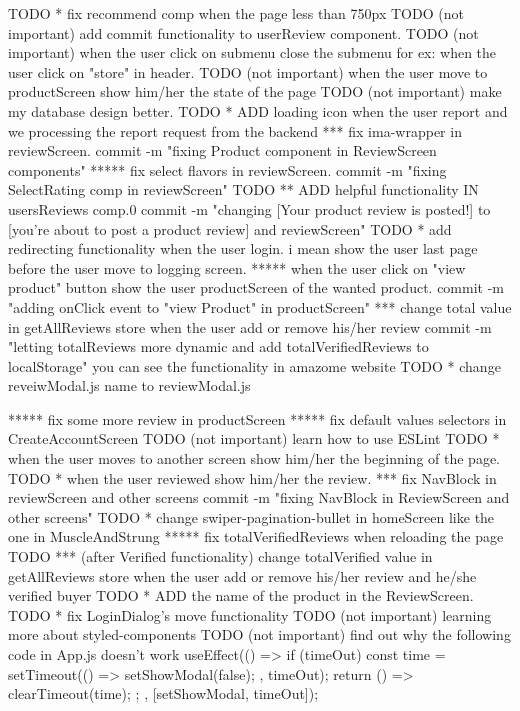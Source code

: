 {TODO * fix recommend comp when the page less than 750px
TODO (not important) add commit functionality to userReview component.
TODO (not important) when the user click on submenu close the submenu for ex: when the user click on "store" in header.
TODO (not important) when the user move to productScreen show him/her the state of the page
TODO (not important) make my database design better.
TODO * ADD loading icon when the user report and we processing the report request from the backend
*** fix ima-wrapper in reviewScreen.
    commit -m "fixing Product component in ReviewScreen components"
***** fix select flavors in reviewScreen.
    commit -m "fixing SelectRating comp in reviewScreen"
TODO ** ADD helpful functionality IN usersReviews comp.0
        commit -m "changing [Your product review is posted!] to [you're about to post a product review] and reviewScreen"
TODO * add redirecting functionality when the user login. i mean show the user last page before the user move to logging screen.
***** when the user click on "view product" button show the user productScreen of the wanted product.
      commit -m "adding onClick event to "view Product" in productScreen"
*** change total value in getAllReviews store when the user add or remove his/her review
    commit -m "letting totalReviews more dynamic and add totalVerifiedReviews to localStorage"
      you can see the functionality in amazome website
TODO * change reveiwModal.js name to reviewModal.js

***** fix some more review in productScreen
***** fix default values selectors in CreateAccountScreen 
TODO (not important) learn how to use ESLint
TODO * when the user moves to another screen show him/her the beginning of the page.
TODO * when the user reviewed show him/her the review.
*** fix NavBlock in reviewScreen and other screens
      commit -m "fixing NavBlock in ReviewScreen and other screens"
TODO * change swiper-pagination-bullet in homeScreen like the one in MuscleAndStrung
***** fix totalVerifiedReviews when reloading the page
TODO *** (after Verified functionality) change totalVerified value in getAllReviews store when the user add or remove his/her review and he/she verified buyer
TODO * ADD the name of the product in the ReviewScreen.
TODO * fix  LoginDialog's move functionality 
TODO (not important) learning more about styled-components
TODO (not important) find out why the following code in App.js doesn't work
     useEffect(() => {
    if (timeOut) {
      const time = setTimeout(() => {
        setShowModal(false);
      }, timeOut);
      return () => {
        clearTimeout(time);
      };
    }
  }, [setShowModal, timeOut]);

}
